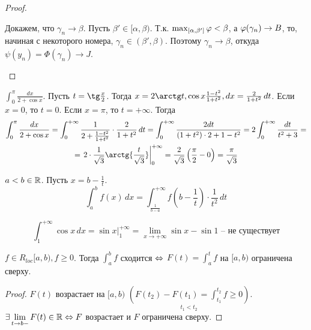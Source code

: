 \begin{MyList}
\begin{proof}
\begin{MyList}
			Докажем, что $\gamma_n \to \beta$. Пусть $\beta' \in [\alpha, \beta)$. Т.к. $\max_{[\alpha, \beta']} \varphi < \beta$, а
			$\varphi(\gamma_n) \to B$, то, начиная с некоторого номера, $\gamma_n \in (\beta', \beta)$. Поэтому $\gamma_n \to \beta$, откуда $\psi(y_n) = \Phi(\gamma_n) \to J$.     
		\end{MyList}
	\end{proof}

	\begin{Example}
		$\int_0^\pi \frac{dx}{2 + \cos x}$. Пусть $t = \tg \frac{x}{2}$. Тогда $x = 2 \arctg t, \cos x \frac{1 - t^2}{1 + t^2}, dx = \frac{2}{1 + t^2}\,dt$. 
		Если $x = 0$, то $t = 0$. Если $x = \pi$, то $t = +\infty$. Тогда
		\begin{gather*}
		\int_0^\pi \frac{dx}{2 + \cos x} = \int_0^{+\infty} \frac{1}{2 + \frac{1 - t^2}{1 + t^2}} \cdot \frac{2}{1 + t^2}\,dt = \int_0^{+\infty} \frac{2dt}{(1 + t^2) \cdot 2 + 1 - t^2} = 2 \int_0^{+\infty} \frac{dt}{t^2 + 3} = \\
		=  \left.2 \cdot \frac{1}{\sqrt{3}} \arctg{\frac{t}{\sqrt{3}}}\right|_0^{+\infty} = \frac{2}{\sqrt{3}}\left(\frac{\pi}{2} - 0\right) = \frac{\pi}{\sqrt{3}}
		\end{gather*}
	\end{Example}

	\begin{Rem}
		$a < b \in \mathbb{R}$. Пусть $x = b - \frac{1}{t}$.
		\[\int_a^b f(x) \,dx = \int_{\frac{1}{b - a}}^{+\infty} f\left(b - \frac{1}{t}\right)\cdot \frac{1}{t^2}\,dt\]
	\end{Rem}

	\begin{Example}
		\[\int_1^{+\infty} \cos x \,dx = \left.\sin x\right|_1^{+\infty} = \lim_{x \to +\infty} \sin x - \sin 1 \textrm{ -- не существует}\]
	\end{Example}
\end{MyList}



\begin{Lm}
	$f \in R_{loc} [a, b), f \geqslant 0$. Тогда $\int_a^b f$ сходится $\Leftrightarrow$ $F(t) = \int_a^t f$ на $[a, b)$ ограничена сверху. 
\end{Lm}

\begin{proof}
	$F(t)$ возрастает на $[a, b)$ $\underset{t_1 < t_2} {\left( F(t_2) - F(t_1) = \int_{t_1}^{t_2} f \geqslant 0\right)}$.\\
	$\displaystyle{\exists \lim_{t \to b-} F(t) \in \mathbb{R}\Leftrightarrow F}$ возрастает и $F$ ограничена сверху. 
\end{proof}

